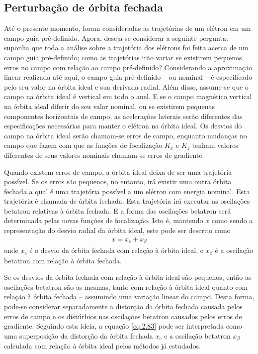 \subsection{Perturbação de órbita fechada}
Até o presente momento, foram consideradas as trajetórias de um elétron em um campo guia pré-definido. Agora, deseja-se considerar a seguinte pergunta: suponha que toda a análise sobre a trajetória dos elétrons foi feita acerca de um campo guia pré-definido; como as trajetórias irão variar se existirem pequenos erros no campo com relação ao campo pré-definido? Considerando a aproximação linear realizada até aqui, o campo guia pré-definido -- ou nominal -- é especificado pelo seu valor na órbita ideal e sua derivada radial. Além disso, assume-se que o campo na órbita ideal é vertical em todo o anel. E se o campo magnético vertical na órbita ideal diferir do seu valor nominal, ou se existirem pequenas componentes horizontais de campo, as acelerações laterais serão diferentes das especificações necessárias para manter o elétron na órbita ideal. Os desvios do campo na órbita ideal serão chamam-se erros de campo, enquanto mudanças no campo que fazem com que as funções de focalização $K_x$ e $K_z$ tenham valores diferentes de seus valores nominais chamam-se erros de gradiente.

Quando existem erros de campo, a órbita ideal deixa de ser uma trajetória possível. Se os erros são pequenos, no entanto, irá existir uma outra órbita fechada a qual é uma trajetória possível a um elétron com energia nominal. Esta trajetória é chamada de órbita fechada. Esta trajetória irá executar as oscilações betatron relativas à órbita fechada. E a forma das oscilações betatron será determinada pelas novas funções de focalização. Isto é, mantendo $x$ como sendo a representação do desvio radial da órbita ideal, este pode ser descrito como
\begin{align}
	x = x_c + x_\beta\label{eq:2.83}
\end{align}
onde $x_c$ é o desvio da órbita fechada com relação à órbita ideal, e $x_\beta$ é a oscilação betatron com relação à órbita fechada.

Se os desvios da órbita fechada com relação à órbita ideal são pequenos, então as oscilações betatron são as mesmas, tanto com relação à órbita ideal quanto com relação à órbita fechada -- assumindo uma variação linear do campo. Desta forma, pode-se considerar separadamente a distorção da órbita fechada causada pelos erros de campo e os distúrbios nas oscilações betatron causados pelos erros de gradiente. Seguindo esta ideia, a equação \eqref{eq:2.83} pode ser interpretada como uma superposição da distorção da órbita fechada $x_c$ e a oscilação betatron $x_\beta$ calculada com relação à órbita ideal pelos métodos já estudados.


